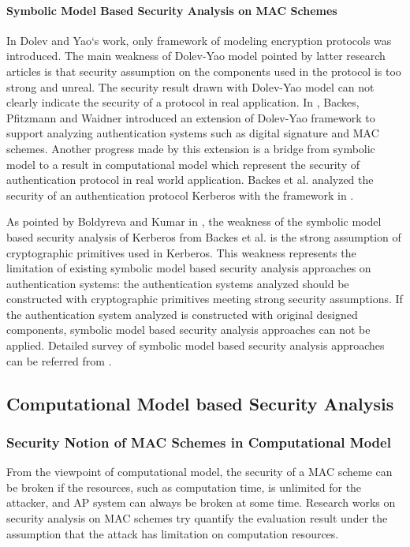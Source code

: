 \documentclass{article}
\begin{document}
\paragraph{Symbolic Model Based Security Analysis on MAC Schemes}
In Dolev and Yao`s work, only framework of modeling encryption protocols was
introduced. The main weakness of Dolev-Yao model pointed by latter research
articles is that security assumption on the components used in the protocol is
too strong and unreal. The security result drawn with Dolev-Yao model can not
clearly indicate the security of a protocol in real application. In
\cite{symbolic-mac},
Backes, Pfitzmann and Waidner introduced an extension of Dolev-Yao framework to
support analyzing authentication systems such as digital signature and MAC
schemes. Another progress made by this extension is a bridge from symbolic model
to a result in computational model which represent the security of
authentication protocol in real world application.  Backes et al. analyzed the security of an authentication protocol
Kerberos with the framework in \cite{symbolic-kerberos}.

As pointed by Boldyreva and Kumar in \cite{computational-kerberos}, the weakness of the symbolic model based security
analysis of Kerberos from Backes et al. is the strong assumption of
cryptographic primitives used in Kerberos. This weakness represents the limitation
of existing symbolic model based security analysis approaches on authentication
systems: the authentication systems analyzed should be constructed with
cryptographic primitives meeting strong security assumptions. If the
authentication system analyzed is constructed with original designed components,
symbolic model based security analysis approaches can not be applied. 
Detailed survey of symbolic model based security analysis approaches can be
referred from \cite{symbolic-survey}.

\subsection{Computational Model based Security Analysis}
\subsubsection{Security Notion of MAC Schemes in Computational Model}
From the viewpoint of computational model, the security of a MAC scheme can be
broken if the resources, such as computation time, is unlimited for the
attacker, and AP system can always be broken at some time. Research works on
security analysis on MAC schemes try quantify the evaluation result under the assumption that the attack has limitation on computation resources.
\end{document}
